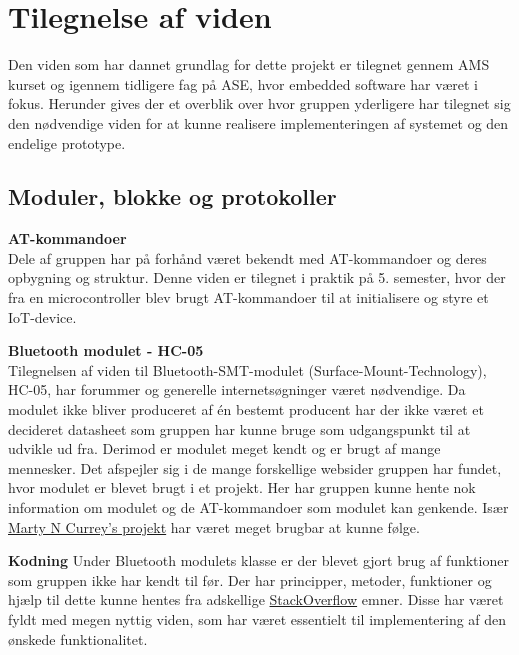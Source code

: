 \graphicspath{{Chapters/Alternative/}}


\section{Tilegnelse af viden}

Den viden som har dannet grundlag for dette projekt er tilegnet gennem AMS kurset og igennem tidligere fag på ASE, hvor embedded software har været i fokus. Herunder gives der et overblik over hvor gruppen yderligere har tilegnet sig den nødvendige viden for at kunne realisere implementeringen af systemet og den endelige prototype.

\subsection{Moduler, blokke og protokoller}
  
\textbf{AT-kommandoer} \\
Dele af gruppen har på forhånd været bekendt med AT-kommandoer og deres opbygning og struktur. Denne viden er tilegnet i praktik på 5. semester, hvor der fra en microcontroller blev brugt AT-kommandoer til at initialisere og styre et IoT-device.

\textbf{Bluetooth modulet - HC-05}\\
Tilegnelsen af viden til Bluetooth-SMT-modulet (Surface-Mount-Technology), HC-05, har forummer og generelle internetsøgninger været nødvendige. Da modulet ikke bliver produceret af én bestemt producent har der ikke været et decideret datasheet som gruppen har kunne bruge som udgangspunkt til at udvikle ud fra. Derimod er modulet meget kendt og er brugt af mange mennesker. Det afspejler sig i de mange forskellige websider gruppen har fundet, hvor modulet er blevet brugt i et projekt. Her har gruppen kunne hente nok information om modulet og de AT-kommandoer som modulet kan genkende.
Især \href{http://www.martyncurrey.com/arduino-with-hc-05-bluetooth-module-at-mode/}{Marty N Currey's projekt} har været meget brugbar at kunne følge.

\textbf{Kodning}
Under Bluetooth modulets klasse er der blevet gjort brug af funktioner som gruppen ikke har kendt til før. Der har principper, metoder, funktioner og hjælp til dette kunne hentes fra adskellige \href{https://stackoverflow.com}{StackOverflow} emner. Disse har været fyldt med megen nyttig viden, som har været essentielt til implementering af den ønskede funktionalitet.

